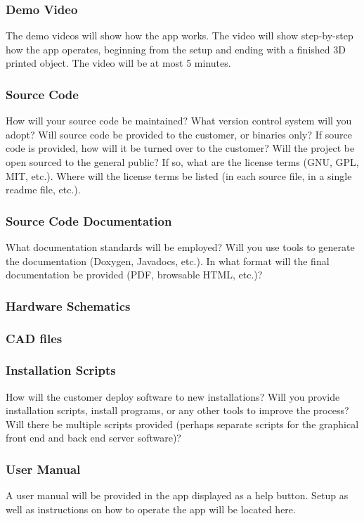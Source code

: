 \subsubsection{Demo Video}
The demo videos will show how the app works. The video will show step-by-step how the app operates, beginning from the setup and ending with a finished 3D printed object. The video will be at most 5 minutes.

\subsubsection{Source Code}
How will your source code be maintained? What version control system will you adopt? Will source code be provided to the customer, or binaries only? If source code is provided, how will it be turned over to the customer? Will the project be open sourced to the general public? If so, what are the license terms (GNU, GPL, MIT, etc.). Where will the license terms be listed (in each source file, in a single readme file, etc.).

\subsubsection{Source Code Documentation}
What documentation standards will be employed? Will you use tools to generate the documentation (Doxygen, Javadocs, etc.). In what format will the final documentation be provided (PDF, browsable HTML, etc.)?

\subsubsection{Hardware Schematics}

\subsubsection{CAD files}

\subsubsection{Installation Scripts}
How will the customer deploy software to new installations? Will you provide installation scripts, install programs, or any other tools to improve the process? Will there be multiple scripts provided (perhaps separate scripts for the graphical front end and back end server software)? 

\subsubsection{User Manual}
A user manual will be provided in the app displayed as a help button. Setup as well as instructions on how to operate the app will be located here.
